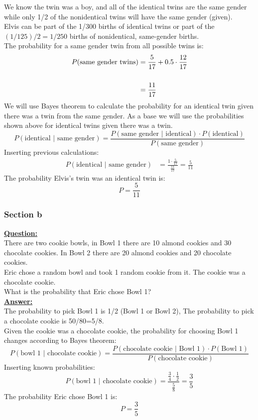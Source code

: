 \documentclass[a4, 12pt,titlepage]{scrartcl}
\begin{document}
We know the twin was a boy, and all of the identical twins are the same gender while only 1/2 of the nonidentical twins will have the same gender (given).\\
Elvis can be part of the 1/300 births of identical twins or part of the $(1/125)/2=1/250$ births of nonidentical, same-gender births.\\
The probability for a same gender twin from all possible twins is:
\begin{align*}
P(\textrm{same gender twins})&=\frac{5}{17}+0.5\cdot \frac{12}{17}\\\smallskip\\
&=\frac{11}{17}
\end{align*}
We will use Bayes theorem to calculate the probability for an identical twin given there was a twin from the same gender. 
As a base we will use the probabilities shown above for identical twins given there was a twin.\[
P(\textrm{identical $|$ same gender})=\frac{P(\textrm{same gender $|$ identical})\cdot P(\textrm{identical})}{P(\textrm{same gender})}
\]Inserting previous calculations:
\begin{align*}
P(\textrm{identical $|$ same gender})&=\frac{1\cdot \frac{5}{17}}{\frac{11}{17}}=\frac{5}{11}
\end{align*}
The probability Elvis's twin was an identical twin is:
\[
\boxed{P=\frac{5}{11}}
\]
\newpage
\subsubsection{Section b}
\textbf{\underline{Question:}}\\
There are two cookie bowls, in Bowl 1 there are 10 almond cookies and 30 chocolate cookies. In Bowl 2 there are 20 almond cookies and 20 chocolate cookies.\\
Eric chose a random bowl and took 1 random cookie from it. The cookie was a chocolate cookie.\\
What is the probability that Eric chose Bowl 1?\\
\textbf{\underline{Answer:}}\\
The probability to pick Bowl 1 is 1/2 (Bowl 1 or Bowl 2),
The probability to pick a chocolate cookie is 50/80=5/8.\\
Given the cookie was a chocolate cookie, the probability for choosing Bowl 1 changes according to Bayes theorem:\\
\[
P(\textrm{bowl 1 $|$ chocolate cookie})=\frac{P(\textrm{chocolate cookie $|$ Bowl 1})\cdot P(\textrm{Bowl 1})}{P(\textrm{chocolate cookie})}
\]
Inserting known probabilities:
\[
P(\textrm{bowl 1 $|$ chocolate cookie})=\frac{\frac{3}{4}\cdot \frac{1}{2}}{\frac{5}{8}}=\frac{3}{5}
\]
The probability Eric chose Bowl 1 is:
\[
\boxed{P=\frac{3}{5}}
\]
\newpage
\end{document}
